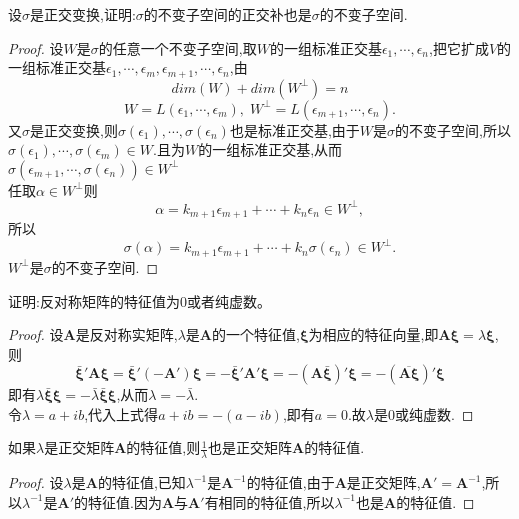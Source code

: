 \documentclass[lang=cn,11pt,normal]{elegantbook}
\begin{document}
	\begin{exercise}
		设$\sigma$是正交变换,证明:$\sigma$的不变子空间的正交补也是$\sigma$的不变子空间.
	\end{exercise}
	\begin{proof}
		设$W$是$\sigma$的任意一个不变子空间,取$W$的一组标准正交基$\epsilon_1,\cdots,\epsilon_n$,把它扩成$V$的一组标准正交基$\epsilon_1,\cdots,\epsilon_m,\epsilon_{m+1},\cdots,\epsilon_n$,由
		$$
		dim(W)+dim(W^\perp)=n
		$$
		$$
		W=L(\epsilon_1,\cdots,\epsilon_m),\;W^\perp=L(\epsilon_{m+1},\cdots,\epsilon_n).
		$$
		又$\sigma$是正交变换,则$\sigma(\epsilon_1),\cdots,\sigma(\epsilon_n)$也是标准正交基,由于$W$是$\sigma$的不变子空间,所以$\sigma(\epsilon_1),\cdots,\sigma(\epsilon_m)\in W$.且为$W$的一组标准正交基,从而$\sigma(\epsilon_{m+1},\cdots,\sigma(\epsilon_n))\in W^\perp$\\
		任取$\alpha\in W^\perp$则
		$$
		\alpha=k_{m+1}\epsilon_{m+1}+\cdots+k_n\epsilon_n\in W^\perp,
		$$
		所以
		$$
		\sigma(\alpha)=k_{m+1}\epsilon_{m+1}+\cdots+k_n\sigma(\epsilon_n)\in W^\perp.
		$$
		$W^\perp$是$\sigma$的不变子空间.
	\end{proof}
	\begin{exercise}
		证明:反对称矩阵的特征值为0或者纯虚数。
	\end{exercise}
	\begin{proof}
		设$\boldsymbol{A}$是反对称实矩阵,$\lambda$是$\boldsymbol{A}$的一个特征值,$\boldsymbol{\xi}$为相应的特征向量,即$\boldsymbol{A\xi}=\lambda\boldsymbol{\xi}$,则
		$$
		\bar{\boldsymbol{\xi}}'\boldsymbol{A\xi}=\bar{\boldsymbol{\xi}}'(-\boldsymbol{A}')\boldsymbol{\xi}=-\bar{\boldsymbol{\xi}}'\boldsymbol{A}'\boldsymbol{\xi}=-(\boldsymbol{A}\bar{\boldsymbol{\xi}})'\boldsymbol{\xi}=-(\overline{\boldsymbol{A\xi}})'\boldsymbol{\xi}
		$$
		即有$\lambda\bar{\boldsymbol{\xi}}\boldsymbol{\xi}=-\bar{\lambda}\bar{\boldsymbol{\xi}}\boldsymbol{\xi}$,从而$\lambda=-\bar{\lambda}$.\\
		令$\lambda=a+ib$,代入上式得$a+ib=-(a-ib)$,即有$a=0$.故$\lambda$是0或纯虚数.
	\end{proof}
	\begin{exercise}
		如果$\lambda$是正交矩阵$\boldsymbol{A}$的特征值,则$\frac{1}{\lambda}$也是正交矩阵$\boldsymbol{A}$的特征值.
	\end{exercise}
	\begin{proof}
		设$\lambda$是$\boldsymbol{A}$的特征值,已知$\lambda^{-1}$是$\boldsymbol{A}^{-1}$的特征值,由于$\boldsymbol{A}$是正交矩阵,$\boldsymbol{A}'=\boldsymbol{A}^{-1}$,所以$\lambda^{-1}$是$\boldsymbol{A}'$的特征值.因为$\boldsymbol{A}$与$\boldsymbol{A}'$有相同的特征值,所以$\lambda^{-1}$也是$\boldsymbol{A}$的特征值.
	\end{proof}
\end{document}

